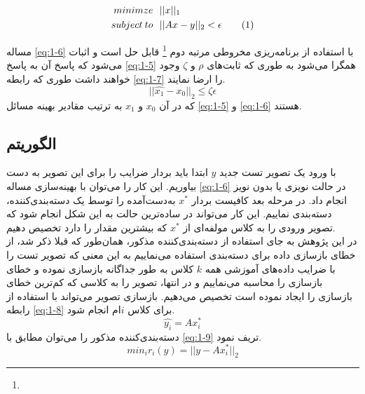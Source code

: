 \documentclass[12pt,twocolumn]{article}
\newcommand\numberthis[1][]{%
    \refstepcounter{equation}%
    \ifx#1\empty\else\label{eq:#1}\fi%
    \tag{\theequation}%
}
\newcommand{\enfootnote}[1]{\footnote{\lr{#1}}}
\begin{document}
\begin{align*}
minimze& \>\>\> ||x||_1 \\
subject\>to& \>\>\> ||Ax - y||_2 < \epsilon
\numberthis
\label{eq:1-6}
\end{align*}

مساله
 \eqref{eq:1-6}
  با استفاده از برنامه‌ریزی مخروطی مرتبه دوم
  \enfootnote{Second Order Cone Programming}
   قابل حل است و اثبات می‌شود که پاسخ آن به پاسخ
    \eqref{eq:1-5}
     همگرا می‌شود به طوری ‌که ثابت‌های $\rho$ و $\zeta$ وجود خواهند داشت طوری که رابطه \eqref{eq:1-7} را ارضا نمایند.
\begin{equation}
||\hat{x_1} - x_0||_2 \le \zeta \epsilon
\label{eq:1-7}
\end{equation}
که در آن 
$x_0$
 و 
 $x_1$ به ترتیب مقادیر بهینه مسائل \eqref{eq:1-5} و \eqref{eq:1-6} هستند.

\subsection{الگوریتم}
 با ورود یک تصویر تست جدید $y$ ابتدا باید بردار ضرایب را برای این تصویر به دست‌ بیاوریم. این کار را می‌توان با بهینه‌سازی مساله \eqref{eq:1-6} در حالت نویزی یا بدون نویز انجام داد. در مرحله بعد کافیست بردار $x^*$ به‌دست‌آمده را توسط یک دسته‌بندی‌کننده، دسته‌بندی نماییم. این کار می‌تواند در ساده‌ترین حالت به این شکل انجام شود که تصویر ورودی را به کلاس مولفه‌ای از $x^*$ که بیشترین مقدار را دارد تخصیص دهیم.
\\
در این پژوهش به جای استفاده از دسته‌بندی‌کننده مذکور، همان‌طور که قبلا ذکر شد، از خطای بازسازی داده‌ برای دسته‌بندی استفاده می‌نماییم به این معنی که تصویر تست را با ضرایب داده‌های آموزشی همه $k$ کلاس به طور جداگانه بازسازی نموده و خطای بازسازی را محاسبه می‌نماییم و در انتها،‌ تصویر را به کلاسی که کم‌ترین خطای بازسازی را ایجاد نموده است تخصیص می‌دهیم. بازسازی تصویر می‌تواند با استفاده از رابطه \eqref{eq:1-8} برای کلاس $i$ام انجام شود.
\begin{equation}
\hat{y_i} = Ax^*_i
\label{eq:1-8}
\end{equation}
دسته‌بندی‌کننده مذکور را می‌توان مطابق با \eqref{eq:1-9} تریف نمود.
\\
\begin{equation}
min_i r_i(y) = ||y - Ax^*_i||_2
\label{eq:1-9}
\end{equation}
\end{document}
